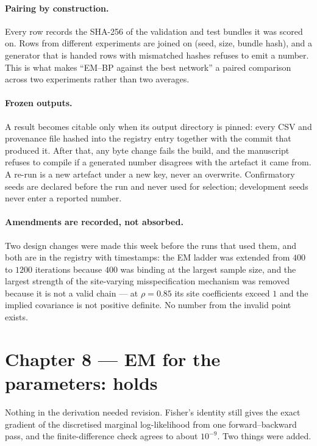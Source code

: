 \documentclass[11pt,a4paper]{article}
\begin{document}
\paragraph{Pairing by construction.}
Every row records the SHA-256 of the validation and test bundles it was scored on. Rows from
different experiments are joined on (seed, size, bundle hash), and a generator that is handed rows
with mismatched hashes refuses to emit a number. This is what makes ``EM--BP against the best
network'' a paired comparison across two experiments rather than two averages.

\paragraph{Frozen outputs.}
A result becomes citable only when its output directory is pinned: every CSV and provenance file
hashed into the registry entry together with the commit that produced it. After that, any byte
change fails the build, and the manuscript refuses to compile if a generated number disagrees with
the artefact it came from. A re-run is a new artefact under a new key, never an overwrite.
Confirmatory seeds are declared before the run and never used for selection; development seeds
never enter a reported number.

\paragraph{Amendments are recorded, not absorbed.}
Two design changes were made this week before the runs that used them, and both are in the
registry with timestamps: the EM ladder was extended from $400$ to $1200$ iterations because $400$
was binding at the largest sample size, and the largest strength of the site-varying
misspecification mechanism was removed because it is not a valid chain --- at $\rho=0.85$ its site
coefficients exceed $1$ and the implied covariance is not positive definite. No number from the
invalid point exists.

\section{Chapter 8 --- EM for the parameters: holds}\label{sec:ch8}

Nothing in the derivation needed revision. Fisher's identity still gives the exact gradient of the
discretised marginal log-likelihood from one forward--backward pass, and the finite-difference
check agrees to about $10^{-9}$. Two things were added.
\end{document}
